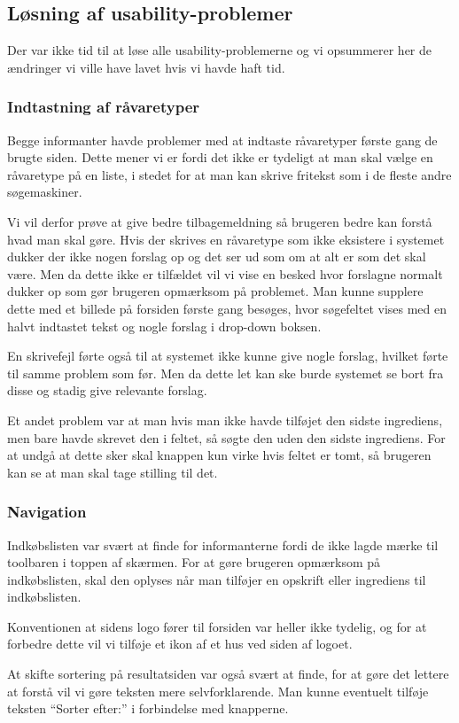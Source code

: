 \subsection{Løsning af usability-problemer}
Der var ikke tid til at løse alle usability-problemerne og vi opsummerer her de ændringer vi ville have lavet hvis vi havde haft tid.

\subsubsection{Indtastning af råvaretyper}
Begge informanter havde problemer med at indtaste råvaretyper første gang de brugte siden.
Dette mener vi er fordi det ikke er tydeligt at man skal vælge en råvaretype på en liste, i stedet for at man kan skrive fritekst som i de fleste andre søgemaskiner.

Vi vil derfor prøve at give bedre tilbagemeldning så brugeren bedre kan forstå hvad man skal gøre. 
Hvis der skrives en råvaretype som ikke eksistere i systemet dukker der ikke nogen forslag op og det ser ud som om at alt er som det skal være.
Men da dette ikke er tilfældet vil vi vise en besked hvor forslagne normalt dukker op som gør brugeren opmærksom på problemet. Man kunne supplere dette med et billede på forsiden første gang \Foodl besøges, hvor søgefeltet vises med en halvt indtastet tekst og nogle forslag i drop-down boksen. 

En skrivefejl førte også til at systemet ikke kunne give nogle forslag, hvilket førte til samme problem som før. 
Men da dette let kan ske burde systemet se bort fra disse og stadig give relevante forslag.

Et andet problem var at man hvis man ikke havde tilføjet den sidste ingrediens, men bare havde skrevet den i feltet, så søgte den uden den sidste ingrediens. 
For at undgå at dette sker skal knappen kun virke hvis feltet er tomt, så brugeren kan se at man skal tage stilling til det.

\subsubsection{Navigation}
Indkøbslisten var svært at finde for informanterne fordi de ikke lagde mærke til toolbaren i toppen af skærmen. 
For at gøre brugeren opmærksom på indkøbslisten, skal den oplyses når man tilføjer en opskrift eller ingrediens til indkøbslisten.

Konventionen at sidens logo fører til forsiden var heller ikke tydelig, og for at forbedre dette vil vi tilføje et ikon af et hus ved siden af logoet.

At skifte sortering på resultatsiden var også svært at finde, for at gøre det lettere at forstå vil vi gøre teksten mere selvforklarende. Man kunne eventuelt tilføje teksten ``Sorter efter:'' i forbindelse med knapperne.
